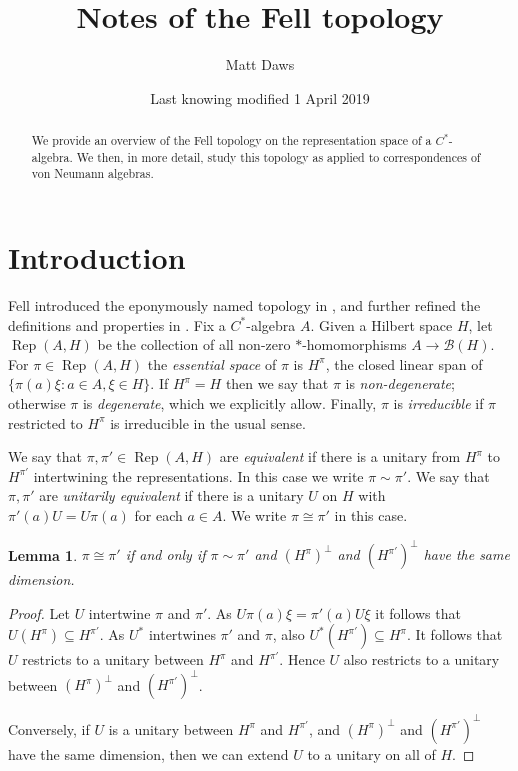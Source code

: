 \documentclass[a4paper,11pt]{article}
\title{Notes of the Fell topology}
\author{Matt Daws}
\date{Last knowing modified 1 April 2019}
\newcommand{\mc}[1]{{\mathcal{#1}}}
\newcommand{\Rep}{\operatorname{Rep}}
\newtheorem{lemma}{Lemma}[section]
\begin{document}
\maketitle

\begin{abstract}
We provide an overview of the Fell topology on the representation space of a
$C^*$-algebra.  We then, in more detail, study this topology as applied to
correspondences of von Neumann algebras.
\end{abstract}

\section{Introduction}

Fell introduced the eponymously named topology in \cite{fell1}, and further
refined the definitions and properties in \cite{fell2}.  Fix a $C^*$-algebra
$A$.  Given a Hilbert space $H$, let $\Rep(A,H)$ be the collection of all
non-zero $*$-homomorphisms $A\rightarrow\mc B(H)$.  For $\pi\in\Rep(A,H)$ the
\emph{essential space} of $\pi$ is $H^\pi$, the closed linear span of
$\{\pi(a)\xi : a\in A, \xi\in H\}$.  If $H^\pi = H$ then we say that $\pi$
is \emph{non-degenerate}; otherwise $\pi$ is \emph{degenerate}, which we
explicitly allow.  Finally, $\pi$ is \emph{irreducible} if $\pi$ restricted
to $H^\pi$ is irreducible in the usual sense.

We say that $\pi,\pi'\in\Rep(A,H)$ are \emph{equivalent} if there is a unitary
from $H^\pi$ to $H^{\pi'}$ intertwining the representations.  In this case we
write $\pi \sim \pi'$. We say that
$\pi,\pi'$ are \emph{unitarily equivalent} if there is a unitary $U$ on $H$
with $\pi'(a) U = U \pi(a)$ for each $a\in A$.  We write $\pi\cong\pi'$ in
this case.

\begin{lemma}
$\pi\cong\pi'$ if and only if $\pi\sim\pi'$ and $(H^\pi)^\perp$ and 
$(H^{\pi'})^\perp$ have the same dimension.
\end{lemma}
\begin{proof}
Let $U$ intertwine $\pi$ and $\pi'$.
As $U\pi(a)\xi = \pi'(a)U\xi$ it follows that $U(H^\pi) \subseteq H^{\pi'}$.
As $U^*$ intertwines $\pi'$ and $\pi$, also $U^*(H^{\pi'}) \subseteq H^\pi$.
It follows that $U$ restricts to a unitary between $H^\pi$ and $H^{\pi'}$.
Hence $U$ also restricts to a unitary between $(H^\pi)^\perp$ and 
$(H^{\pi'})^\perp$.

Conversely, if $U$ is a unitary between $H^\pi$ and $H^{\pi'}$, and
$(H^\pi)^\perp$ and $(H^{\pi'})^\perp$ have the same dimension, then
we can extend $U$ to a unitary on all of $H$.
\end{proof}
\end{document}
